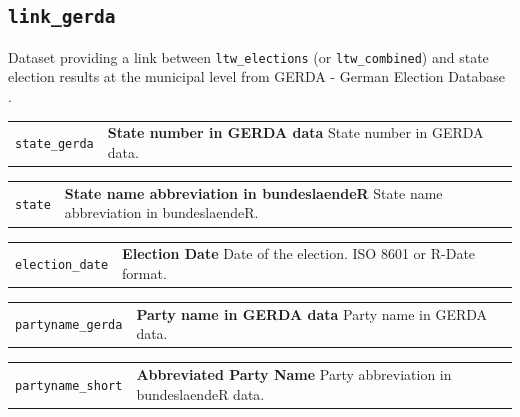 \documentclass[
  a4paper,
  DIV=11,
  numbers=noendperiod]{scrartcl}
\begin{document}
\newpage

\subsection{\texorpdfstring{\texttt{link\_gerda}}{link\_gerda}}\label{link_gerda}

Dataset providing a link between \texttt{ltw\_elections} (or
\texttt{ltw\_combined}) and state election results at the municipal
level from GERDA - German Election Database
\parencite{Heddesheimer2025GERDA}.

\begin{longtable*}{p{3.2cm}| p{11cm}}
\texttt{state\_gerda} &\textbf{State number in GERDA data}\newline 
State number in GERDA data.
\end{longtable*}

\begin{longtable*}{p{3.2cm}| p{11cm}}
\texttt{state} &\textbf{State name abbreviation in bundeslaendeR}\newline 
State name abbreviation in bundeslaendeR.
\end{longtable*}

\begin{longtable*}{p{3.2cm}| p{11cm}}
\texttt{election\_date} &\textbf{Election Date}\newline 
Date of the election.  ISO 8601 or R-Date format.
\end{longtable*}

\begin{longtable*}{p{3.2cm}| p{11cm}}
\texttt{partyname\_gerda} &\textbf{Party name in GERDA data}\newline 
Party name in GERDA data.
\end{longtable*}

\begin{longtable*}{p{3.2cm}| p{11cm}}
\texttt{partyname\_short} &\textbf{Abbreviated Party Name}\newline 
Party abbreviation in bundeslaendeR data.
\end{longtable*}

\newpage


\printbibliography[title=References]
\end{document}
